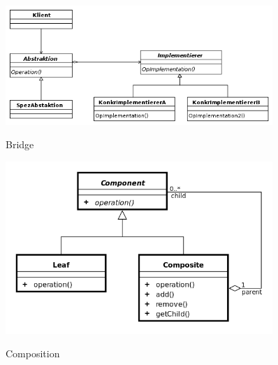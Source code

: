\begin{figure}[htb]
	\centering
	\begin{minipage}[t]{0.45\linewidth}
		\centering
		\includegraphics[width=0.9\textwidth]{images/bridge}
		\label{fig:bridge}
		\caption{Bridge}
	\end{minipage}%
	\hfill
	\begin{minipage}[t]{0.45\linewidth}
		\centering
		\includegraphics[width=0.9\textwidth]{images/composite}
		\label{fig:composite}
		\caption{Composition}
	\end{minipage}
\end{figure}


